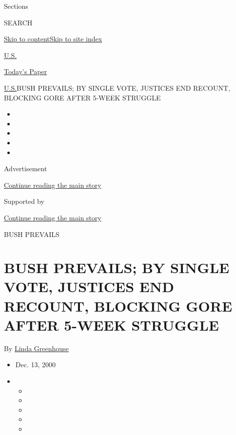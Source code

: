 Sections

SEARCH

\protect\hyperlink{site-content}{Skip to
content}\protect\hyperlink{site-index}{Skip to site index}

\href{https://www.nytimes.com/section/us}{U.S.}

\href{https://myaccount.nytimes.com/auth/login?response_type=cookie\&client_id=vi}{}

\href{https://www.nytimes.com/section/todayspaper}{Today's Paper}

\href{/section/us}{U.S.}\textbar{}BUSH PREVAILS; BY SINGLE VOTE,
JUSTICES END RECOUNT, BLOCKING GORE AFTER 5-WEEK STRUGGLE

\begin{itemize}
\item
\item
\item
\item
\item
\end{itemize}

Advertisement

\protect\hyperlink{after-top}{Continue reading the main story}

Supported by

\protect\hyperlink{after-sponsor}{Continue reading the main story}

BUSH PREVAILS

\hypertarget{bush-prevails-by-single-vote-justices-end-recount-blocking-gore-after-5-week-struggle}{%
\section{BUSH PREVAILS; BY SINGLE VOTE, JUSTICES END RECOUNT, BLOCKING
GORE AFTER 5-WEEK
STRUGGLE}\label{bush-prevails-by-single-vote-justices-end-recount-blocking-gore-after-5-week-struggle}}

By \href{https://www.nytimes.com/by/linda-greenhouse}{Linda Greenhouse}

\begin{itemize}
\item
  Dec. 13, 2000
\item
  \begin{itemize}
  \item
  \item
  \item
  \item
  \item
  \end{itemize}
\end{itemize}

